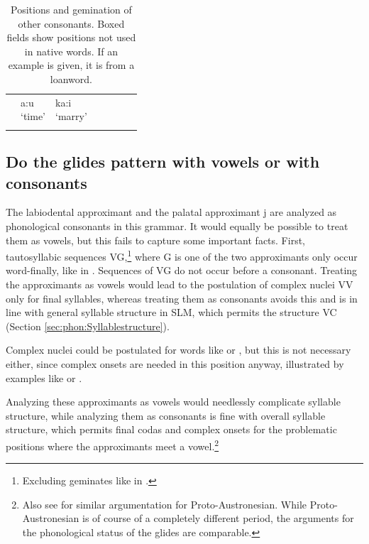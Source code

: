 \begin{table}
\begin{center}
\begin{tabular}{llllll}
		\V 	& \parbox[t]{2cm}{\V a\dentt:u\\`time'}    & \parbox[t]{2cm}{ka:\V i\ng\\`marry'}& \fbox{\parbox[t]{2cm}{~\\}}&\fbox{\parbox[t]{2cm}{~\\}}& \fbox{\parbox[t]{2cm}{~\\}} \\\vspace{0.2cm}
		\end{tabular}
		\caption[Positions and gemination of other consonants]{Positions and gemination of other consonants. Boxed fields show positions not used in native words. If an example is given, it is from a loanword.}
		\label{tab:PositionsAndGeminationsOfConsonants:other}
	\end{center}
\end{table}
 

\subsection{Do the glides pattern with vowels or with consonants}\label{sec:phon:Dotheglidespatternwithvowelsorwithconsonants}
The labiodental approximant \V{} and the palatal approximant j are analyzed as phonological consonants in this grammar. It would equally be possible to treat them as vowels, but this fails to capture some important facts. First, tautosyllabic sequences VG,\footnote{Excluding geminates like in .} where G is one of the two approximants only occur word-finally, like in . Sequences of VG do not occur before a consonant.  Treating the approximants as vowels would lead to the postulation of complex nuclei VV only for final syllables, whereas treating them as consonants avoids this and is in line with general syllable structure in SLM, which permits the structure VC (Section \ref{sec:phon:Syllablestructure}).

Complex nuclei could be postulated for words like  or , but this is not necessary either, since complex onsets are needed in this position anyway, illustrated by examples like  or .

Analyzing these approximants as vowels would needlessly complicate syllable structure, while analyzing them as consonants is fine with overall syllable structure, which permits final codas and complex onsets for the problematic positions where the approximants meet a vowel.\footnote{Also see \citet{Clynes1997} for similar argumentation for Proto-Austronesian. While Proto-Austronesian is of course of a completely different period, the arguments for the phonological status of the glides are comparable.}\kuckn


